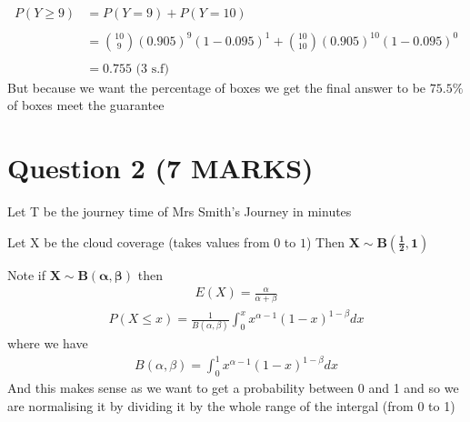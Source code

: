 \documentclass[11pt]{article}
\begin{document}
\begin{align*}
    P(Y \geq 9) &= P(Y=9) + P(Y=10) \\ \\
                &= \binom{10}{9}(0.905)^{9}(1-0.095)^{1} + \binom{10}{10}(0.905)^{10}(1-0.095)^{0} \\ \\
                &= 0.755 \text{ (3 s.f) }
\end{align*}
But because we want the percentage of boxes we get the final answer to be $\boxed{\bm{75.5 \%}}$ of boxes meet the guarantee
\section{Question 2 (7 MARKS)}

Let T be the journey time of Mrs Smith's Journey in minutes

Let X be the cloud coverage (takes values from $0$ to $1$) Then $\bm{X \sim B(\frac{1}{2},1)}$

Note if $\bm{X \sim B(\alpha,\beta)}$ then
\begin{align*}
    E(X) = \frac{\alpha}{\alpha + \beta}
\end{align*}
\begin{align*}
    P(X \leq x) = \frac{1}{B(\alpha,\beta)} \int_{0}^{x} x^{\alpha-1}(1-x)^{1-\beta} dx
\end{align*}
where we have
\begin{align*}
    B(\alpha,\beta) = \int_{0}^{1} x^{\alpha-1}(1-x)^{1-\beta} dx
\end{align*}
And this makes sense as we want to get a probability between 0 and 1 and so we are normalising it by dividing it by the whole range of the intergal (from 0 to 1)
\end{document}
